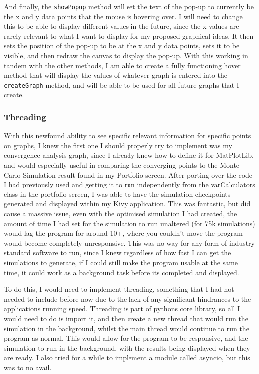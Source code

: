 \documentclass{article}
\begin{document}
\vspace{0.3cm}
And finally, the \texttt{showPopup} method will set the text of the pop-up to currently be the x and y data points that the mouse is hovering over. I will need to change this to be able to display different values in the future, since the x values are rarely relevant to what I want to display for my proposed graphical ideas. It then sets the position of the pop-up to be at the x and y data points, sets it to be visible, and then redraw the canvas to display the pop-up. With this working in tandem with the other methods, I am able to create a fully functioning hover method that will display the values of whatever graph is entered into the \texttt{createGraph} method, and will be able to be used for all future graphs that I create.\\\vspace{0.3cm}

\subsubsection{Threading}
With this newfound ability to see specific relevant information for specific points on graphs, I knew the first one I should properly try to implement was my convergence analysis graph, since I already knew how to define it for MatPlotLib, and would especially useful in comparing the converging points to the Monte Carlo Simulation result found in my Portfolio screen. After porting over the code I had previously used and getting it to run independently from the varCalculators class in the portfolio screen, I was able to have the simulation checkpoints generated and displayed within my Kivy application. This was fantastic, but did cause a massive issue, even with the optimised simulation I had created, the amount of time I had set for the simulation to run unaltered (for 75k simulations) would lag the program for around 10+, where you couldn't move the program would become completely unresponsive. This was no way for any form of industry standard software to run, since I knew regardless of how fast I can get the simulations to generate, if I could still make the program usable at the same time, it could work as a background task before its completed and displayed.

To do this, I would need to implement threading, something that I had not needed to include before now due to the lack of any significant hindrances to the applications running speed. Threading is part of pythons core library, so all I would need to do is import it, and then create a new thread that would run the simulation in the background, whilst the main thread would continue to run the program as normal. This would allow for the program to be responsive, and the simulation to run in the background, with the results being displayed when they are ready. I also tried for a while to implement a module called asyncio, but this was to no avail.
\end{document}
